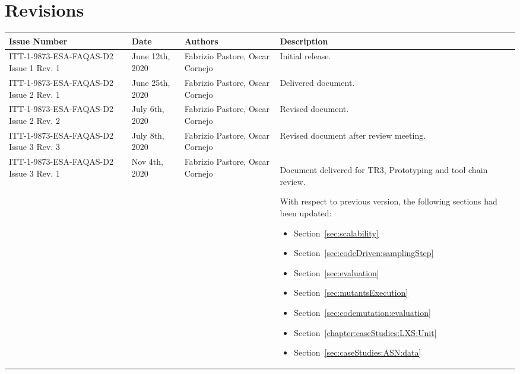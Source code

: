 
\section*{Revisions}
\label{sec:revisions}


\setlength\LTleft{0pt}
\setlength\LTright{0pt}
\tiny 
\begin{longtable}{|p{2cm}|p{1cm}|p{1.5cm}|p{9cm}|@{}}
\label{table:codeoperators} \\
\hline
\textbf{Issue Number}&\textbf{Date}&\textbf{Authors}&\textbf{Description}\\
\hline
ITT-1-9873-ESA-FAQAS-D2
Issue 1 Rev. 1&
June 12th, 2020&
Fabrizio Pastore, Oscar Cornejo&
\begin{minipage}{8cm}
Initial release.
\end{minipage}
\\
\hline
ITT-1-9873-ESA-FAQAS-D2
Issue 2 Rev. 1&
June 25th, 2020&
Fabrizio Pastore, Oscar Cornejo&
\begin{minipage}{8cm}
Delivered document.
\end{minipage}
\\
\hline
ITT-1-9873-ESA-FAQAS-D2
Issue 2 Rev. 2&
July 6th, 2020&
Fabrizio Pastore, Oscar Cornejo&
\begin{minipage}{8cm}
Revised document.
\end{minipage}
\\
\hline
ITT-1-9873-ESA-FAQAS-D2
Issue 3 Rev. 3&
July 8th, 2020&
Fabrizio Pastore, Oscar Cornejo&
\begin{minipage}{8cm}
Revised document after review meeting.
\end{minipage}
\\
\hline
ITT-1-9873-ESA-FAQAS-D2
Issue 3 Rev. 1&
Nov 4th, 2020&
Fabrizio Pastore, Oscar Cornejo&
\begin{minipage}{8cm}
Document delivered for TR3, Prototyping and tool chain review.

With respect to previous version, the following sections had been updated:
\begin{itemize}
\item Section~\ref{sec:scalability}
\item Section~\ref{sec:codeDriven:samplingStep}
\item Section~\ref{sec:evaluation}
\item Section~\ref{sec:mutantsExecution}
\item Section~\ref{sec:codemutation:evaluation}
\item Section~\ref{chapter:caseStudies:LXS:Unit}
\item Section~\ref{sec:caseStudies:ASN:data}
\end{itemize}


\end{minipage}
\end{longtable}
